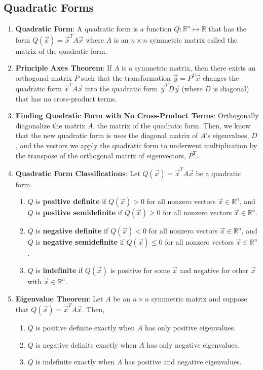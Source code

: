 \documentclass[10pt]{article}
\begin{document}
\subsection{Quadratic Forms}
\begin{enumerate}
\item \textbf{Quadratic Form}: A quadratic form is a function $Q: \mathbb{R}^n \mapsto \mathbb{R}$ that has the form $Q(\vec{x}) = \vec{x}^TA\vec{x}$ where $A$ is an $n \times n$ symmetric matrix called the matrix of the quadratic form.
\item \textbf{Principle Axes Theorem}: If $A$ is a symmetric matrix, then there exists an orthogonal matrix $P$ such that the transformation $\vec{y} = P^T\vec{x}$ changes the quadratic form $\vec{x}^TA\vec{x}$ into the quadratic form $\vec{y}^TD\vec{y}$ (where $D$ is diagonal) that has no cross-product terms. 
\item \textbf{Finding Quadratic Form with No Cross-Product Terms}: Orthogonally diagonalize the matrix $A$, the matrix of the quadratic form. Then, we know that the new quadratic form is uses the diagonal matrix of $A$'s eigenvalues, $D$, and the vectors we apply the quadratic form to underwent multiplication by the transpose of the orthogonal matrix of eigenvectors, $P^T$.
\item \textbf{Quadratic Form Classifications}: Let $Q(\vec{x}) = \vec{x}^TA\vec{x}$ be a quadratic form.
\begin{enumerate}
\item $Q$ is \textbf{positive definite} if $Q(\vec{x}) > 0$ for all nonzero vectors $\vec{x} \in \mathbb{R}^n$, and $Q$ is \textbf{positive semidefinite} if $Q(\vec{x}) \geq 0$ for all nonzero vectors $\vec{x} \in \mathbb{R}^n$.
\item $Q$ is \textbf{negative definite} if $Q(\vec{x}) < 0$ for all nonzero vectors $\vec{x} \in \mathbb{R}^n$, and $Q$ is \textbf{negative semidefinite} if $Q(\vec{x}) \leq 0$ for all nonzero vectors $\vec{x} \in \mathbb{R}^n$.
\item $Q$ is \textbf{indefinite} if $Q(\vec{x})$ is positive for some $\vec{x}$ and negative for other $\vec{x}$ with $\vec{x} \in \mathbb{R}^n$.
\end{enumerate}
\item \textbf{Eigenvalue Theorem}: Let $A$ be an $n \times n$ symmetric matrix and suppose that $Q(\vec{x}) = \vec{x}^TA\vec{x}$. Then,
\begin{enumerate}
\item $Q$ is positive definite exactly when $A$ has only positive eigenvalues.
\item $Q$ is negative definite exactly when $A$ has only negative eigenvalues.
\item $Q$ is indefinite exactly when $A$ has positive and negative eigenvalues.
\end{enumerate}
\end{enumerate}
\end{document}
